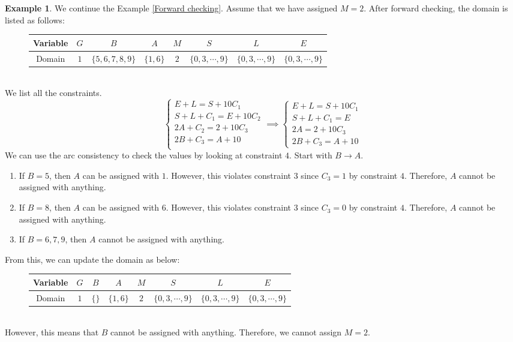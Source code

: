\documentclass{article}
\theoremstyle{definition}
\newtheorem{example}{Example}[definition]
\begin{document}
\newpage
\begin{example}
	We continue the Example \ref{Forward checking}. Assume that we have assigned $M=2$. After forward checking, the domain is listed as follows:
	\begin{figure}[h]
		\centering
		\begin{tabular}{|c||c|c|c|c|c|c|c|}
			\hline
			Variable & $G$ & $B$ & $A$ & $M$ & $S$ & $L$ & $E$\\
			\hline
			Domain & $1$ & $\{5,6,7,8,9\}$ & $\{1,6\}$ & $2$ & $\{0,3,\cdots,9\}$ & $\{0,3,\cdots,9\}$ & $\{0,3,\cdots,9\}$\\
			\hline
		\end{tabular}
	\end{figure}\\
	We list all the constraints.
	\begin{equation*}
		\begin{cases}
			E+L=S+10C_{1}\\
			S+L+C_{1}=E+10C_{2}\\
			2A+C_{2}=2+10C_{3}\\
			2B+C_{3}=A+10\\
		\end{cases}\implies\begin{cases}
			E+L=S+10C_{1}\\
			S+L+C_{1}=E\\
			2A=2+10C_{3}\\
			2B+C_{3}=A+10
		\end{cases}
	\end{equation*}
	We can use the arc consistency to check the values by looking at constraint $4$. Start with $B\to A$.
	\begin{enumerate}
		\item If $B=5$, then $A$ can be assigned with $1$. However, this violates constraint $3$ since $C_{3}=1$ by constraint $4$. Therefore, $A$ cannot be assigned with anything. 
		\item If $B=8$, then $A$ can be assigned with $6$. However, this violates constraint $3$ since $C_{3}=0$ by constraint $4$. Therefore, $A$ cannot be assigned with anything.
		\item If $B=6,7,9$, then $A$ cannot be assigned with anything. 
	\end{enumerate}
	From this, we can update the domain as below:
	\begin{figure}[h]
		\centering
		\begin{tabular}{|c||c|c|c|c|c|c|c|}
			\hline
			Variable & $G$ & $B$ & $A$ & $M$ & $S$ & $L$ & $E$\\
			\hline
			Domain & $1$ & $\{\}$ & $\{1,6\}$ & $2$ & $\{0,3,\cdots,9\}$ & $\{0,3,\cdots,9\}$ & $\{0,3,\cdots,9\}$\\
			\hline
		\end{tabular}
	\end{figure}\\
	However, this means that $B$ cannot be assigned with anything. Therefore, we cannot assign $M=2$.
\end{example}
\end{document}
